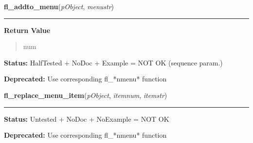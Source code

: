     \label{xformslib:library:fl_addto_menu}

    \vspace{0.5ex}

\hspace{.8\funcindent}\begin{boxedminipage}{\funcwidth}

    \raggedright \textbf{fl\_addto\_menu}(\textit{pObject}, \textit{menustr})

    \vspace{-1.5ex}

    \rule{\textwidth}{0.5\fboxrule}
\setlength{\parskip}{2ex}
\setlength{\parskip}{1ex}
      \textbf{Return Value}
    \vspace{-1ex}

      \begin{quote}
      num

      \end{quote}

\textbf{Status:} HalfTested + NoDoc + Example = NOT OK (sequence param.)



\textbf{Deprecated:} Use corresponding fl\_*nmenu* function



    \end{boxedminipage}

    \label{xformslib:library:fl_replace_menu_item}

    \vspace{0.5ex}

\hspace{.8\funcindent}\begin{boxedminipage}{\funcwidth}

    \raggedright \textbf{fl\_replace\_menu\_item}(\textit{pObject}, \textit{itemnum}, \textit{itemstr})

    \vspace{-1.5ex}

    \rule{\textwidth}{0.5\fboxrule}
\setlength{\parskip}{2ex}
\setlength{\parskip}{1ex}
\textbf{Status:} Untested + NoDoc + NoExample = NOT OK



\textbf{Deprecated:} Use corresponding fl\_*nmenu* function



    \end{boxedminipage}

